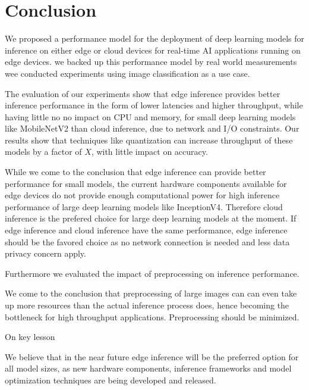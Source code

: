 \chapter{Conclusion}
\label{chap:conclusion}
%
We proposed a performance model for the deployment of deep learning models for inference on either edge or cloud devices for real-time AI applications running on edge devices.
we backed up this performance model by real world measurements wee conducted experiments using image classification as a use case.

The evaluation of our experiments show that edge inference provides better inference performance in the form of lower latencies and higher throughput, while having little no no impact on CPU and memory, for small deep learning models like MobileNetV2 than cloud inference, due to network and I/O constraints. 
Our results show that techniques like quantization can increase throughput of these models by a factor of $X$, with little impact on accuracy.

While we come to the conclusion that edge inference can provide better performance for small models, the current hardware components available for edge devices do not provide enough computational power for high inference performance of large deep learning models like InceptionV4.
Therefore cloud inference is the prefered choice for large deep learning models at the moment.
If edge inference and cloud inference have the same performance, edge inference should be the favored choice as no network connection is needed and less data privacy concern apply.



Furthermore we evaluated the impact of preprocessing on inference performance.



We come to the conclusion that preprocessing of large images can can even take up more resources than the actual inference process does, hence becoming the bottleneck for high throughput applications.
Preprocessing should be minimized.


On key lesson



We believe that in the near future edge inference will be the preferred option for all model sizes, as new hardware components, inference frameworks and model optimization techniques are being developed and released.
